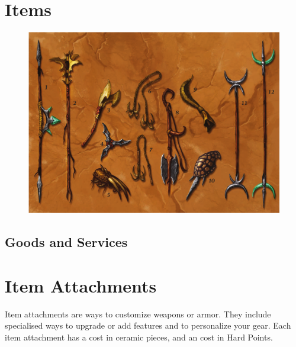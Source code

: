 \begin{multicols}{2}
\end{multicols}
\FloatBarrier
\section{Items}\label{sec:items}

\begin{figure}[!htb]
\centering
\includegraphics[width=0.8\linewidth]{images/weapons.png}
\end{figure}


\hrulefill

\hrulefill


\FloatBarrier
\subsection{Goods and Services}

\hrulefill

\hrulefill


\FloatBarrier
\section{Item Attachments}

Item attachments are ways to customize weapons or armor. They include specialised
ways to upgrade or add features and to personalize your gear. Each item attachment
has a cost in ceramic pieces, and an cost in Hard Points.

